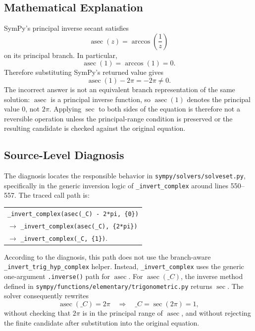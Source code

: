\documentclass[11pt]{article}
\begin{document}
\subsection{Mathematical Explanation}

SymPy's principal inverse secant satisfies
\[
  \operatorname{asec}(z) = \arccos\!\left(\frac{1}{z}\right)
\]
on its principal branch.  In particular,
\[
  \operatorname{asec}(1) = \arccos(1) = 0.
\]
Therefore substituting SymPy's returned value gives
\[
  \operatorname{asec}(1) - 2\pi = -2\pi \ne 0.
\]
The incorrect answer is not an equivalent branch representation of the same
solution: \(\operatorname{asec}\) is a principal inverse function, so
\(\operatorname{asec}(1)\) denotes the principal value \(0\), not \(2\pi\).
Applying \(\sec\) to both sides of the equation is therefore not a reversible
operation unless the principal-range condition is preserved or the resulting
candidate is checked against the original equation.

\subsection{Source-Level Diagnosis}

The diagnosis locates the responsible behavior in
\nolinkurl{sympy/solvers/solveset.py}, specifically in the generic inversion
logic of \texttt{\_invert\_complex} around lines 550--557.  The traced call
path is:
\begin{center}
\begin{tabular}{@{}l@{}}
\texttt{\_invert\_complex(asec(\_C) - 2*pi, \{0\})} \\
\(\to\) \texttt{\_invert\_complex(asec(\_C), \{2*pi\})} \\
\(\to\) \texttt{\_invert\_complex(\_C, \{1\})}.
\end{tabular}
\end{center}
According to the diagnosis, this path does not use the branch-aware
\texttt{\_invert\_trig\_hyp\_complex} helper.  Instead, \texttt{\_invert\_complex}
uses the generic one-argument \texttt{.inverse()} path for \(\operatorname{asec}\).
For \(\operatorname{asec}(\_C)\), the inverse method defined in
\nolinkurl{sympy/functions/elementary/trigonometric.py} returns \(\sec\).
The solver consequently rewrites
\[
  \operatorname{asec}(\_C) = 2\pi
  \quad\Longrightarrow\quad
  \_C = \sec(2\pi) = 1,
\]
without checking that \(2\pi\) is in the principal range of
\(\operatorname{asec}\), and without rejecting the finite candidate after
substitution into the original equation.
\end{document}
